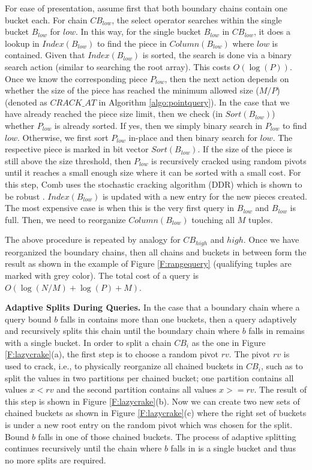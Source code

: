\documentclass{sig-alternate}
\begin{document}
For ease of presentation, assume first that both boundary chains contain one bucket each.
For chain $CB_{low}$, the select operator searches within the single bucket $B_{low}$ for $low$.
In this way, for the single bucket $B_{low}$ in $CB_{low}$,
it does a lookup in $Index(B_{low})$ to find the piece in $Column(B_{low})$ where $low$ is contained.
Given that $Index(B_{low})$ is sorted, the search is done via a binary search action
(similar to searching the root array). This costs $O(\log(P))$.
Once we know the corresponding piece $P_{low}$, then the next action depends on whether
the size of the piece has reached the minimum allowed size ($M/P$) (denoted as $CRACK\_AT$ in Algorithm \ref{algo:pointquery}).
In the case that we have already reached the piece size limit, then we check (in $Sort(B_{low})$) whether
$P_{low}$ is already sorted. If yes, then we simply binary search in $P_{low}$ to find $low$.
Otherwise, we first sort $P_{low}$ in-place and then binary search for $low$.
The respective piece is marked in bit vector  $Sort(B_{low})$.
If the size of the piece is still above the size threshold,
then $P_{low}$ is recursively cracked using random pivots until it reaches a small enough size
where it can be sorted with a small cost.
For this step, Comb uses the stochastic cracking algorithm (DDR) which is shown to be robust \cite{StochasticCracking}.
$Index(B_{low})$ is updated with a new entry for the new pieces created.
The most expensive case is when this is the very first query in $B_{low}$ and $B_{low}$ is full.
Then, we need to reorganize $Column(B_{low})$ touching all $M$ tuples.

The above procedure is repeated by analogy for $CB_{high}$ and $high$.
Once we have reorganized the boundary chains, then all chains and buckets in between form the result
as shown in the example of Figure \ref{F:rangequery} (qualifying tuples are marked with grey color).
The total cost of a query is $O(\log(N/M) + \log(P) + M)$.


\textbf{Adaptive Splits During Queries.}
In the case that a boundary chain where a query bound $b$ falls in contains more than one buckets, then
a query adaptively and recursively splits this chain until the boundary chain where $b$ falls in
remains with a single bucket.
In order to split a chain $CB_i$ as the one in Figure \ref{F:lazycrake}(a),
the first step is to choose a random pivot $rv$.
The pivot $rv$ is used to crack, i.e., to physically reorganize all chained
buckets in $CB_i$, such as to split the values in two partitions per chained bucket;
one partition contains all values $x<rv$ and the second partition contains all values $x>=rv$.
The result of this step is shown in Figure \ref{F:lazycrake}(b).
Now we can create two new sets of chained buckets as shown in Figure \ref{F:lazycrake}(c) where the right set
of buckets is under a new root entry on the random pivot which was chosen for the split.
Bound $b$ falls in one of those chained buckets. The process of adaptive splitting continues recursively
until the chain where $b$ falls in is a single bucket and thus no more splits are required.
\end{document}
